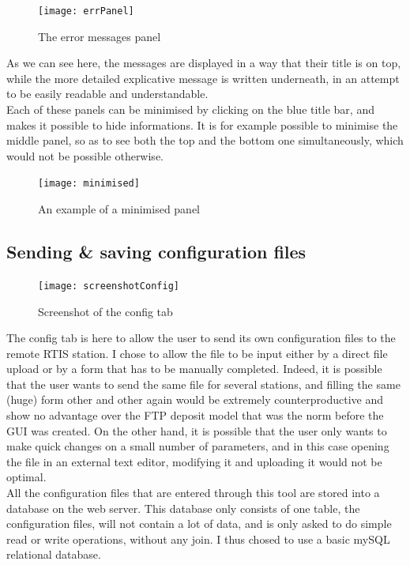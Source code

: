 \documentclass{themeensg}
\begin{document}
\begin{figure}[ht]
	\centering
	\texttt{[image: errPanel]}
	\caption{The error messages panel}
\end{figure}

As we can see here, the messages are displayed in a way that their title is on top, while the more detailed explicative message is written underneath, in an attempt to be easily readable and understandable.\\

Each of these panels can be minimised by clicking on the blue title bar, and makes it possible to hide informations. It is for example possible to minimise the middle panel, so as to see both the top and the bottom one simultaneously, which would not be possible otherwise.\\

\begin{figure}[hb]
	\centering
	\texttt{[image: minimised]}
	\caption{An example of a minimised panel}
\end{figure}


\newpage
\subsection{Sending \& saving configuration files}

\begin{figure}[ht]
	\centering
	\texttt{[image: screenshotConfig]}
	\caption{Screenshot of the config tab}
\end{figure}


The config tab is here to allow the user to send its own configuration files to the remote RTIS station. I chose to allow the file to be input either by a direct file upload or by a form that has to be manually completed. Indeed, it is possible that the user wants to send the same file for several stations, and filling the same (huge) form other and other again would be extremely counterproductive and show no advantage over the FTP deposit model that was the norm before the GUI was created. On the other hand, it is possible that the user only wants to make quick changes on a small number of parameters, and in this case opening the file in an external text editor, modifying it and uploading it would not be optimal. \\

All the configuration files that are entered through this tool are stored into a database on the web server. This database only consists of one table, the configuration files, will not contain a lot of data, and is only asked to do simple read or write operations, without any join. I thus chosed to use a basic mySQL relational database.\\
\end{document}
